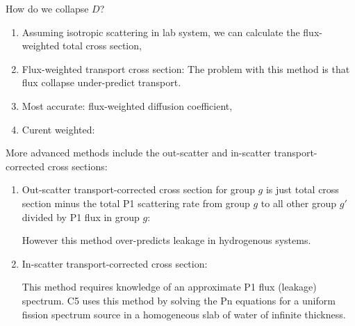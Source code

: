 \documentclass{school-22.211-notes}
\begin{document}
\begin{enumerate}
  How do we collapse $D$? 
  \begin{enumerate}
  \item Assuming isotropic scattering in lab system, we can calculate the flux-weighted total cross section,
  \item Flux-weighted transport cross section: 
    The problem with this method is that flux collapse under-predict transport. 
  \item Most accurate: flux-weighted diffusion coefficient,
  \item Curent weighted: 
  \end{enumerate}
\end{enumerate}

More advanced methods include the out-scatter and in-scatter
transport-corrected cross sections:

\begin{enumerate}
\item Out-scatter transport-corrected cross section for group $g$ is
  just total cross section minus the total P1 scattering rate from
  group $g$ to all other group $g'$ divided by P1 flux in group $g$:


  However this method over-predicts leakage in hydrogenous systems. 

\item In-scatter transport-corrected cross section: 


  This method requires knowledge of an approximate P1 flux (leakage)
  spectrum. C5 uses this method by solving the Pn equations for a
  uniform fission spectrum source in a homogeneous slab of water of
  infinite thickness.
\end{enumerate}
\end{document}
